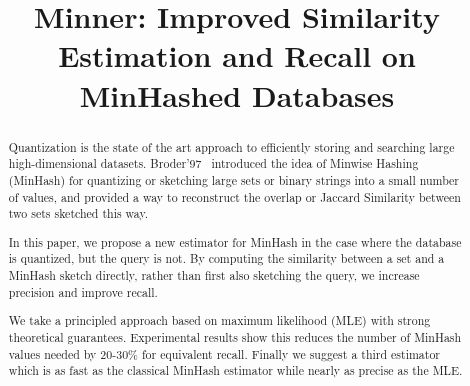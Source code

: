 
\title{Minner: Improved Similarity Estimation and Recall on MinHashed Databases}

\begin{abstract}
   Quantization is the state of the art approach to efficiently storing and searching large high-dimensional datasets.
   Broder'97~\cite{broder1997resemblance} introduced the idea of Minwise Hashing (MinHash) for quantizing or sketching large sets or binary strings into a small number of values, and provided a way to reconstruct the overlap or Jaccard Similarity between two sets sketched this way.

   In this paper, we propose a new estimator for MinHash in the case where the database is quantized, but the query is not.
   By computing the similarity between a set and a MinHash sketch directly, rather than first also sketching the query, we increase precision and improve recall.

   We take a principled approach based on maximum likelihood (MLE) with strong theoretical guarantees.
   Experimental results show this reduces the number of MinHash values needed by 20-30\% for equivalent recall.
   Finally we suggest a third estimator which is as fast as the classical MinHash estimator while nearly as precise as the MLE.







%
%
\end{abstract}

